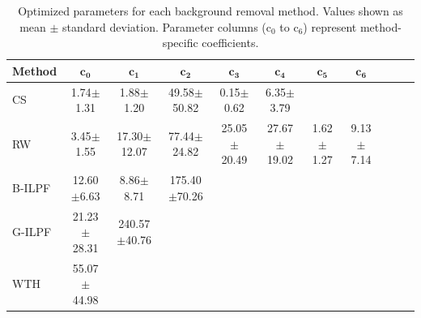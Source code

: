 \documentclass[iucr,review]{iucrjournals}
\begin{document}
\begin{table}[t]
\caption{Optimized parameters for each background removal method. Values shown as mean $\pm$ standard deviation.
Parameter columns (c$_0$ to c$_6$) represent method-specific coefficients.}
\label{tab:optimized_params}
\centering
\small
\setlength{\tabcolsep}{3pt}
\renewcommand{\arraystretch}{1.1}
\begin{tabular}{@{}lcccccccccc@{}}
\toprule
\textbf{Method} & $\mathbf{c_0}$ & $\mathbf{c_1}$ & $\mathbf{c_2}$ & $\mathbf{c_3}$ & $\mathbf{c_4}$ & $\mathbf{c_5}$ & $\mathbf{c_6}$ \\ \midrule
CS     & 1.74$\pm$1.31 & 1.88$\pm$1.20 & 49.58$\pm$50.82 & 0.15$\pm$0.62 & 6.35$\pm$3.79&  &  \\
RW     & 3.45$\pm$1.55 & 17.30$\pm$12.07 & 77.44$\pm$24.82 & 25.05$\pm$20.49 & 27.67$\pm$19.02 & 1.62$\pm$1.27 & 9.13$\pm$7.14 \\
B-ILPF & 12.60$\pm$6.63 & 8.86$\pm$8.71 & 175.40$\pm$70.26 &  &  &  &  \\
G-ILPF & 21.23$\pm$28.31 & 240.57$\pm$40.76  &  &  &  &  &  \\
WTH    & 55.07$\pm$44.98  &  &  &  &  &  &  \\

\bottomrule
\end{tabular}
\end{table}
\end{document}

